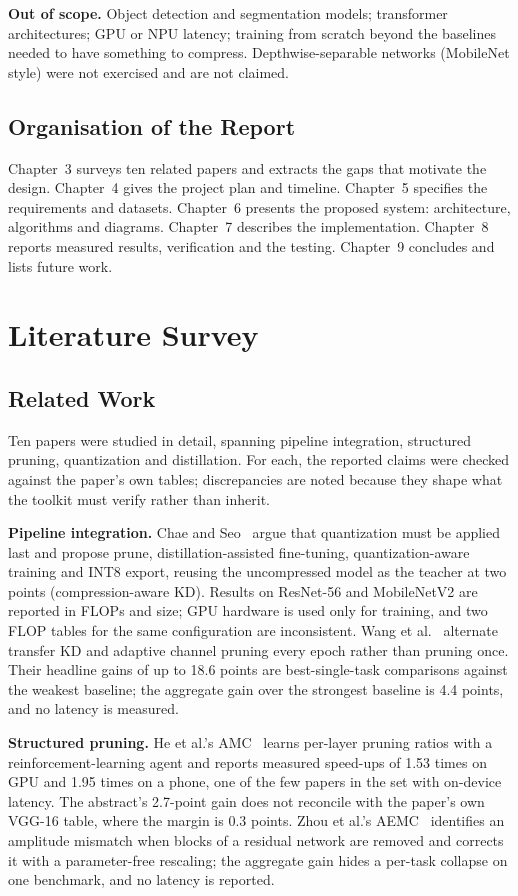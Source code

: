 \documentclass[oneside,a4paper,12pt]{report}
\begin{document}
\textbf{Out of scope.} Object detection and segmentation models; transformer architectures; GPU or NPU latency; training from scratch beyond the baselines needed to have something to compress. Depthwise-separable networks (MobileNet style) were not exercised and are not claimed.

\section{Organisation of the Report}
Chapter~3 surveys ten related papers and extracts the gaps that motivate the design. Chapter~4 gives the project plan and timeline. Chapter~5 specifies the requirements and datasets. Chapter~6 presents the proposed system: architecture, algorithms and diagrams. Chapter~7 describes the implementation. Chapter~8 reports measured results, verification and the testing. Chapter~9 concludes and lists future work.

\chapter{Literature Survey}
\section{Related Work}
Ten papers were studied in detail, spanning pipeline integration, structured pruning, quantization and distillation. For each, the reported claims were checked against the paper's own tables; discrepancies are noted because they shape what the toolkit must verify rather than inherit.

\textbf{Pipeline integration.} Chae and Seo~\cite{chae2026} argue that quantization must be applied last and propose prune, distillation-assisted fine-tuning, quantization-aware training and INT8 export, reusing the uncompressed model as the teacher at two points (compression-aware KD). Results on ResNet-56 and MobileNetV2 are reported in FLOPs and size; GPU hardware is used only for training, and two FLOP tables for the same configuration are inconsistent. Wang et al.~\cite{wang2025} alternate transfer KD and adaptive channel pruning every epoch rather than pruning once. Their headline gains of up to 18.6 points are best-single-task comparisons against the weakest baseline; the aggregate gain over the strongest baseline is 4.4 points, and no latency is measured.

\textbf{Structured pruning.} He et al.'s AMC~\cite{he2018} learns per-layer pruning ratios with a reinforcement-learning agent and reports measured speed-ups of 1.53 times on GPU and 1.95 times on a phone, one of the few papers in the set with on-device latency. The abstract's 2.7-point gain does not reconcile with the paper's own VGG-16 table, where the margin is 0.3 points. Zhou et al.'s AEMC~\cite{zhou2026} identifies an amplitude mismatch when blocks of a residual network are removed and corrects it with a parameter-free rescaling; the aggregate gain hides a per-task collapse on one benchmark, and no latency is reported.
\end{document}
